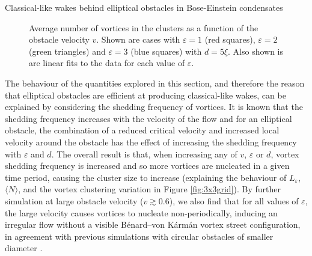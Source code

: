 \begin{chapter}{\label{cha:wake}Classical-like wakes behind elliptical obstacles in Bose-Einstein condensates}
\begin{figure}
\centering
{}
\caption{\label{fig:Svslocal2} Average number of vortices in the clusters as a function of the obstacle velocity $v$.  Shown are cases with $\varepsilon=1$ (red squares),  $\varepsilon=2$ (green triangles) and $\varepsilon=3$ (blue squares) with $d=5\xi$. Also shown is are linear fits to the data for each value of $\varepsilon$.}
\end{figure}

The behaviour of the quantities explored in this section, and therefore the reason that elliptical obstacles are efficient at producing classical-like wakes, can be explained by considering the shedding frequency of vortices. It is known that the shedding frequency increases with the velocity of the flow \cite{jma99} and for an elliptical obstacle, the combination of a reduced critical velocity and increased local velocity around the obstacle has the effect of increasing the shedding frequency with $\varepsilon$ and $d$. The overall result is that, when increasing any of $v$, $\varepsilon$ or $d$, vortex shedding frequency is increased and so more vortices are nucleated in a given time period, causing the cluster size to increase (explaining the behaviour of $L_\varepsilon$, $\langle N\rangle$, and the vortex clustering variation in Figure \ref{fig:3x3grid}). By further simulation at large obstacle velocity ($v\gtrsim0.6$), we also find that for all values of $\varepsilon$, the large velocity causes vortices to nucleate non-periodically, inducing an irregular flow without a visible B\'enard--von K\'arm\'an vortex street configuration, in agreement with previous simulations with circular obstacles of smaller diameter \cite{saito10}.


\end{chapter}
